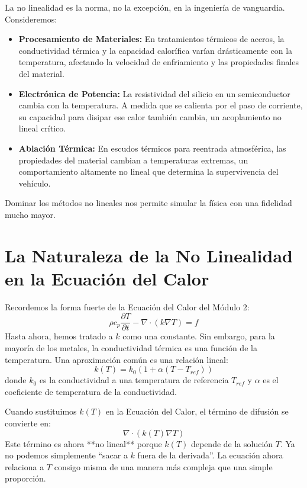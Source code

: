 \documentclass[11pt, a4paper]{article}
\begin{document}
\begin{infobox}
La no linealidad es la norma, no la excepción, en la ingeniería de vanguardia. Consideremos:
\begin{itemize}
    \item \textbf{Procesamiento de Materiales:} En tratamientos térmicos de aceros, la conductividad térmica y la capacidad calorífica varían drásticamente con la temperatura, afectando la velocidad de enfriamiento y las propiedades finales del material.
    \item \textbf{Electrónica de Potencia:} La resistividad del silicio en un semiconductor cambia con la temperatura. A medida que se calienta por el paso de corriente, su capacidad para disipar ese calor también cambia, un acoplamiento no lineal crítico.
    \item \textbf{Ablación Térmica:} En escudos térmicos para reentrada atmosférica, las propiedades del material cambian a temperaturas extremas, un comportamiento altamente no lineal que determina la supervivencia del vehículo.
\end{itemize}
Dominar los métodos no lineales nos permite simular la física con una fidelidad mucho mayor.
\end{infobox}

\section{La Naturaleza de la No Linealidad en la Ecuación del Calor}
Recordemos la forma fuerte de la Ecuación del Calor del Módulo 2:
$$ \rho c_p \frac{\partial T}{\partial t} - \nabla \cdot (k \nabla T) = f $$
Hasta ahora, hemos tratado a $k$ como una constante. Sin embargo, para la mayoría de los metales, la conductividad térmica es una función de la temperatura. Una aproximación común es una relación lineal:
\begin{equation}
    k(T) = k_0 (1 + \alpha (T - T_{ref}))
    \label{eq:k_lineal}
\end{equation}
donde $k_0$ es la conductividad a una temperatura de referencia $T_{ref}$ y $\alpha$ es el coeficiente de temperatura de la conductividad.

Cuando sustituimos $k(T)$ en la Ecuación del Calor, el término de difusión se convierte en:
$$ \nabla \cdot (k(T) \nabla T) $$
Este término es ahora **no lineal** porque $k(T)$ depende de la solución $T$. Ya no podemos simplemente ``sacar a $k$ fuera de la derivada''. La ecuación ahora relaciona a $T$ consigo misma de una manera más compleja que una simple proporción.
\end{document}
